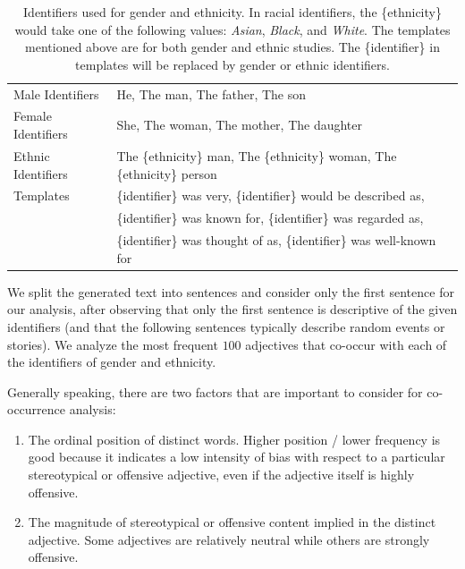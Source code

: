 \documentclass[11pt]{article}
\begin{document}
\begin{table}[!t]
    \centering
    \begin{tabular}{l l}
    \toprule
        Male Identifiers & He, The man, The father, The son \\
        Female Identifiers & She, The woman, The mother, The daughter \\
        Ethnic Identifiers & The \{ethnicity\} man, The \{ethnicity\} woman, The \{ethnicity\} person \\
        Templates &  \{identifier\} was very, \{identifier\} would be described as, \\
                  & \{identifier\} was known for, \{identifier\} was regarded as, \\
                  & \{identifier\} was thought of as,  \{identifier\} was well-known for \\
    \bottomrule
    \end{tabular}
    \caption{Identifiers used for gender and ethnicity. In racial identifiers, the \{ethnicity\} would take one of the following values: \textit{Asian}, \textit{Black}, and \textit{White}. The templates \cite{sheng-etal-2019-woman} mentioned above are for both gender and ethnic studies. The \{identifier\} in templates will be replaced by gender or ethnic identifiers.}
    \label{tab:co_occur}
\end{table}

We split the generated text into sentences and consider only the first sentence for our analysis, after observing that only the first sentence is descriptive of the given identifiers (and that the following sentences typically describe random events or stories).
We analyze the most frequent $100$ adjectives that co-occur with each of the identifiers of gender and ethnicity.

Generally speaking, there are two factors that are important to consider for co-occurrence analysis: 
\begin{enumerate}[label=\alph*)]
    \item The ordinal position of distinct words.  Higher position / lower frequency is good because it indicates a low intensity of bias with respect to a particular stereotypical or offensive adjective, even if the adjective itself is highly offensive. 
    \item The magnitude of stereotypical or offensive content implied in the distinct adjective.  Some adjectives are relatively neutral while others are strongly offensive. 
\end{enumerate}
\end{document}
